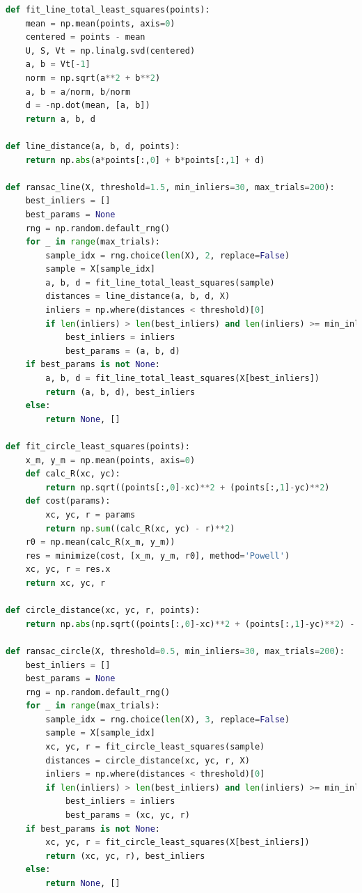 \documentclass[10pt,a4paper,twocolumn]{article}
\begin{document}
\begin{lstlisting}[language=Python, style=mystyle]
def fit_line_total_least_squares(points):
    mean = np.mean(points, axis=0)
    centered = points - mean
    U, S, Vt = np.linalg.svd(centered)
    a, b = Vt[-1]
    norm = np.sqrt(a**2 + b**2)
    a, b = a/norm, b/norm
    d = -np.dot(mean, [a, b])
    return a, b, d

def line_distance(a, b, d, points):
    return np.abs(a*points[:,0] + b*points[:,1] + d)

def ransac_line(X, threshold=1.5, min_inliers=30, max_trials=200):
    best_inliers = []
    best_params = None
    rng = np.random.default_rng()
    for _ in range(max_trials):
        sample_idx = rng.choice(len(X), 2, replace=False)
        sample = X[sample_idx]
        a, b, d = fit_line_total_least_squares(sample)
        distances = line_distance(a, b, d, X)
        inliers = np.where(distances < threshold)[0]
        if len(inliers) > len(best_inliers) and len(inliers) >= min_inliers:
            best_inliers = inliers
            best_params = (a, b, d)
    if best_params is not None:
        a, b, d = fit_line_total_least_squares(X[best_inliers])
        return (a, b, d), best_inliers
    else:
        return None, []

def fit_circle_least_squares(points):
    x_m, y_m = np.mean(points, axis=0)
    def calc_R(xc, yc):
        return np.sqrt((points[:,0]-xc)**2 + (points[:,1]-yc)**2)
    def cost(params):
        xc, yc, r = params
        return np.sum((calc_R(xc, yc) - r)**2)
    r0 = np.mean(calc_R(x_m, y_m))
    res = minimize(cost, [x_m, y_m, r0], method='Powell')
    xc, yc, r = res.x
    return xc, yc, r

def circle_distance(xc, yc, r, points):
    return np.abs(np.sqrt((points[:,0]-xc)**2 + (points[:,1]-yc)**2) - r)

def ransac_circle(X, threshold=0.5, min_inliers=30, max_trials=200):
    best_inliers = []
    best_params = None
    rng = np.random.default_rng()
    for _ in range(max_trials):
        sample_idx = rng.choice(len(X), 3, replace=False)
        sample = X[sample_idx]
        xc, yc, r = fit_circle_least_squares(sample)
        distances = circle_distance(xc, yc, r, X)
        inliers = np.where(distances < threshold)[0]
        if len(inliers) > len(best_inliers) and len(inliers) >= min_inliers:
            best_inliers = inliers
            best_params = (xc, yc, r)
    if best_params is not None:
        xc, yc, r = fit_circle_least_squares(X[best_inliers])
        return (xc, yc, r), best_inliers
    else:
        return None, []
\end{lstlisting}
\end{document}
